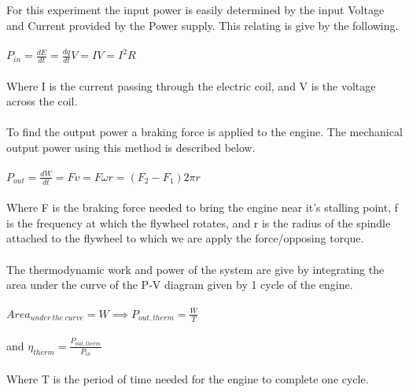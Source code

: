 \documentclass{article}
\begin{document}
For this experiment the input power is easily determined by the input Voltage and Current provided by the Power supply. This relating is give by the following.\\\\
$P_{in}=\frac{dE}{dt}=\frac{dq}{dt}V=IV=I^2R$\\\\
Where I is the current passing through the electric coil, and V is the voltage across the coil.\\\\
To find the output power a braking force is applied to the engine. The mechanical output power using this method is described below.\\\\
$P_{out}=\frac{dW}{dt}=Fv=F\omega r=(F_{2}-F_{1})2\pi r$\\\\
Where F is the braking force needed to bring the engine near it's stalling point, f is the frequency at which the flywheel rotates, and r is the radius of the spindle attached to the flywheel to which we are apply the force/opposing torque.\\\\
The thermodynamic work and power of the system are give by integrating the area under the curve of the P-V diagram given by 1 cycle of the engine.\\\\
$Area_{under\ the\ curve}=W \implies P_{out,therm}=\frac{W}{T}$\\\\
and $\eta_{therm}=\frac{P_{out,therm}}{P_{in}}$\\\\
Where T is the period of time needed for the engine to complete one cycle.
\end{document}

